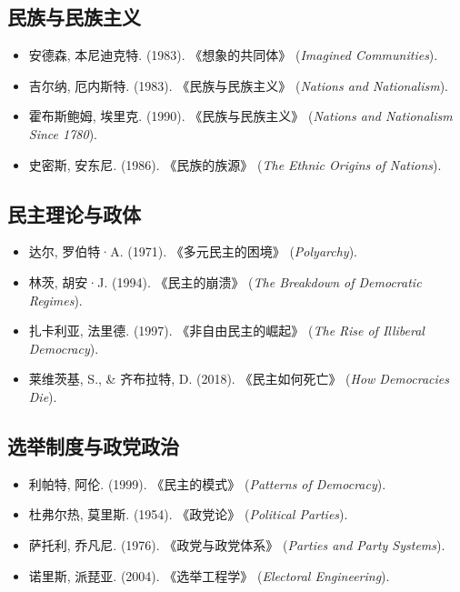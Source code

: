\documentclass[a5paper, 11pt, openany]{ctexbook}
\begin{document}
\subsection*{民族与民族主义}
\begin{itemize}
    \item 安德森, 本尼迪克特. (1983). 《想象的共同体》 (\textit{Imagined Communities}).
    \item 吉尔纳, 厄内斯特. (1983). 《民族与民族主义》 (\textit{Nations and Nationalism}).
    \item 霍布斯鲍姆, 埃里克. (1990). 《民族与民族主义》 (\textit{Nations and Nationalism Since 1780}).
    \item 史密斯, 安东尼. (1986). 《民族的族源》 (\textit{The Ethnic Origins of Nations}).
\end{itemize}

\subsection*{民主理论与政体}
\begin{itemize}
    \item 达尔, 罗伯特·A. (1971). 《多元民主的困境》 (\textit{Polyarchy}).
    \item 林茨, 胡安·J. (1994). 《民主的崩溃》 (\textit{The Breakdown of Democratic Regimes}).
    \item 扎卡利亚, 法里德. (1997). 《非自由民主的崛起》 (\textit{The Rise of Illiberal Democracy}).
    \item 莱维茨基, S., \& 齐布拉特, D. (2018). 《民主如何死亡》 (\textit{How Democracies Die}).
\end{itemize}

\subsection*{选举制度与政党政治}
\begin{itemize}
    \item 利帕特, 阿伦. (1999). 《民主的模式》 (\textit{Patterns of Democracy}).
    \item 杜弗尔热, 莫里斯. (1954). 《政党论》 (\textit{Political Parties}).
    \item 萨托利, 乔凡尼. (1976). 《政党与政党体系》 (\textit{Parties and Party Systems}).
    \item 诺里斯, 派琵亚. (2004). 《选举工程学》 (\textit{Electoral Engineering}).
\end{itemize}
\end{document}

